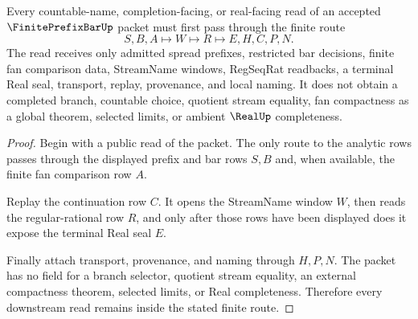 \begin{theorem}
\label{thm:finite-prefix-bar-nonescape}
Every countable-name, completion-facing, or real-facing read of an accepted $\FinitePrefixBarUp$ packet must first pass through the finite route
$$
S,B,A \longmapsto W \longmapsto R \longmapsto E,H,C,P,N .
$$
The read receives only admitted spread prefixes, restricted bar decisions, finite fan comparison data, StreamName windows, RegSeqRat readbacks, a terminal Real seal, transport, replay, provenance, and local naming. It does not obtain a completed branch, countable choice, quotient stream equality, fan compactness as a global theorem, selected limits, or ambient $\RealUp$ completeness.
\end{theorem}
\begin{proof}
Begin with a public read of the packet. The only route to the analytic rows passes through the displayed prefix and bar rows $S,B$ and, when available, the finite fan comparison row $A$.

Replay the continuation row $C$. It opens the StreamName window $W$, then reads the regular-rational row $R$, and only after those rows have been displayed does it expose the terminal Real seal $E$.

Finally attach transport, provenance, and naming through $H,P,N$. The packet has no field for a branch selector, quotient stream equality, an external compactness theorem, selected limits, or Real completeness. Therefore every downstream read remains inside the stated finite route.
\end{proof}



